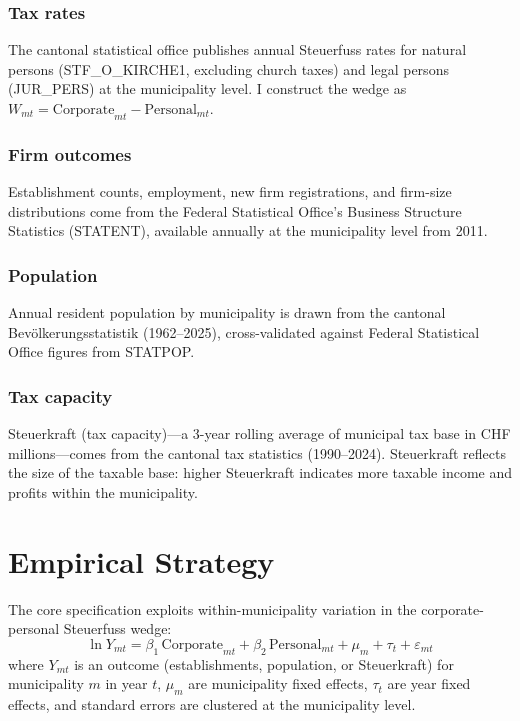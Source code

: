 \documentclass[12pt]{article}
\begin{document}
\subsubsection*{Tax rates} The cantonal statistical office publishes annual Steuerfuss rates for natural persons (STF\_O\_KIRCHE1, excluding church taxes) and legal persons (JUR\_PERS) at the municipality level. I construct the wedge as $W_{mt} = \text{Corporate}_{mt} - \text{Personal}_{mt}$.

\subsubsection*{Firm outcomes} Establishment counts, employment, new firm registrations, and firm-size distributions come from the Federal Statistical Office's Business Structure Statistics (STATENT), available annually at the municipality level from 2011.

\subsubsection*{Population} Annual resident population by municipality is drawn from the cantonal Bev\"olkerungsstatistik (1962--2025), cross-validated against Federal Statistical Office figures from STATPOP.

\subsubsection*{Tax capacity} Steuerkraft (tax capacity)---a 3-year rolling average of municipal tax base in CHF millions---comes from the cantonal tax statistics (1990--2024). Steuerkraft reflects the size of the taxable base: higher Steuerkraft indicates more taxable income and profits within the municipality.




\section{Empirical Strategy}

The core specification exploits within-municipality variation in the corporate-personal Steuerfuss wedge:
\begin{equation}
\ln Y_{mt} = \beta_1 \, \text{Corporate}_{mt} + \beta_2 \, \text{Personal}_{mt} + \mu_m + \tau_t + \varepsilon_{mt}
\label{eq:main}
\end{equation}
where $Y_{mt}$ is an outcome (establishments, population, or Steuerkraft) for municipality $m$ in year $t$, $\mu_m$ are municipality fixed effects, $\tau_t$ are year fixed effects, and standard errors are clustered at the municipality level.
\end{document}
